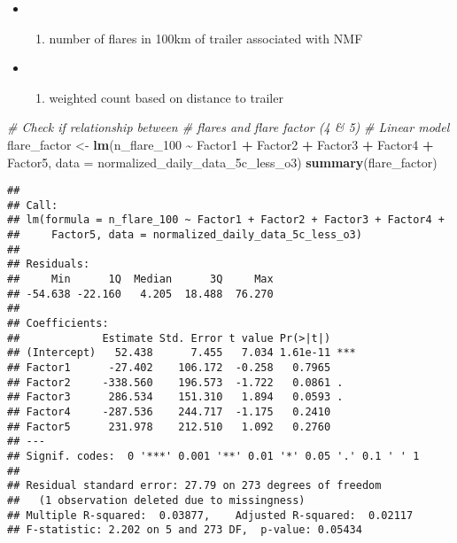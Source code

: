 \documentclass[
]{article}
\newenvironment{Shaded}{\begin{snugshade}}{\end{snugshade}}
\newcommand{\AttributeTok}[1]{\textcolor[rgb]{0.13,0.29,0.53}{#1}}
\newcommand{\CommentTok}[1]{\textcolor[rgb]{0.56,0.35,0.01}{\textit{#1}}}
\newcommand{\FunctionTok}[1]{\textcolor[rgb]{0.13,0.29,0.53}{\textbf{#1}}}
\newcommand{\NormalTok}[1]{#1}
\newcommand{\OtherTok}[1]{\textcolor[rgb]{0.56,0.35,0.01}{#1}}
\newcommand{\SpecialCharTok}[1]{\textcolor[rgb]{0.81,0.36,0.00}{\textbf{#1}}}
\providecommand{\tightlist}{%
  \setlength{\itemsep}{0pt}\setlength{\parskip}{0pt}}
\begin{document}
\begin{itemize}
\tightlist
\item
  \begin{enumerate}
  \def\labelenumi{\arabic{enumi})}
  \tightlist
  \item
    number of flares in 100km of trailer associated with NMF
  \end{enumerate}
\item
  \begin{enumerate}
  \def\labelenumi{\arabic{enumi})}
  \setcounter{enumi}{1}
  \tightlist
  \item
    weighted count based on distance to trailer
  \end{enumerate}
\end{itemize}

\begin{Shaded}
\begin{Highlighting}[]
\CommentTok{\# Check if relationship between \# flares and flare factor (4 \& 5)}
\CommentTok{\# Linear model}
\NormalTok{flare\_factor }\OtherTok{\textless{}{-}} \FunctionTok{lm}\NormalTok{(n\_flare\_100 }\SpecialCharTok{\textasciitilde{}}\NormalTok{ Factor1 }\SpecialCharTok{+}\NormalTok{ Factor2 }\SpecialCharTok{+}\NormalTok{ Factor3 }\SpecialCharTok{+}\NormalTok{ Factor4 }\SpecialCharTok{+}\NormalTok{ Factor5, }
                   \AttributeTok{data =}\NormalTok{ normalized\_daily\_data\_5c\_less\_o3)}
\FunctionTok{summary}\NormalTok{(flare\_factor)}
\end{Highlighting}
\end{Shaded}

\begin{verbatim}
## 
## Call:
## lm(formula = n_flare_100 ~ Factor1 + Factor2 + Factor3 + Factor4 + 
##     Factor5, data = normalized_daily_data_5c_less_o3)
## 
## Residuals:
##     Min      1Q  Median      3Q     Max 
## -54.638 -22.160   4.205  18.488  76.270 
## 
## Coefficients:
##             Estimate Std. Error t value Pr(>|t|)    
## (Intercept)   52.438      7.455   7.034 1.61e-11 ***
## Factor1      -27.402    106.172  -0.258   0.7965    
## Factor2     -338.560    196.573  -1.722   0.0861 .  
## Factor3      286.534    151.310   1.894   0.0593 .  
## Factor4     -287.536    244.717  -1.175   0.2410    
## Factor5      231.978    212.510   1.092   0.2760    
## ---
## Signif. codes:  0 '***' 0.001 '**' 0.01 '*' 0.05 '.' 0.1 ' ' 1
## 
## Residual standard error: 27.79 on 273 degrees of freedom
##   (1 observation deleted due to missingness)
## Multiple R-squared:  0.03877,    Adjusted R-squared:  0.02117 
## F-statistic: 2.202 on 5 and 273 DF,  p-value: 0.05434
\end{verbatim}
\end{document}
